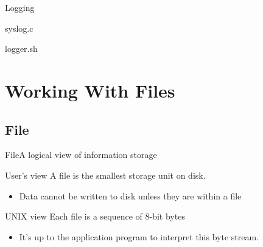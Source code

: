 \begin{frame}{Logging}
  \begin{block}{\ttfamily syslog.c}
    \begin{center}
    \end{center}
  \end{block}
  \begin{block}{\ttfamily logger.sh}
    \begin{center}
    \end{center}
  \end{block}
\end{frame}

\section{Working With Files}
\label{sec:working-with-files}

\subsection{File}
\label{sec:file}

\begin{frame}{File}{A logical view of information storage}
  \begin{block}{User's view}
    A file is the smallest storage unit on disk.
    \begin{itemize}
    \item Data cannot be written to disk unless they are within a file
    \end{itemize}
  \end{block}
  \begin{block}{UNIX view}
    Each file is a sequence of 8-bit bytes
    \begin{itemize}
    \item It's up to the application program to interpret this byte stream.
    \end{itemize}
  \end{block}
\end{frame}

